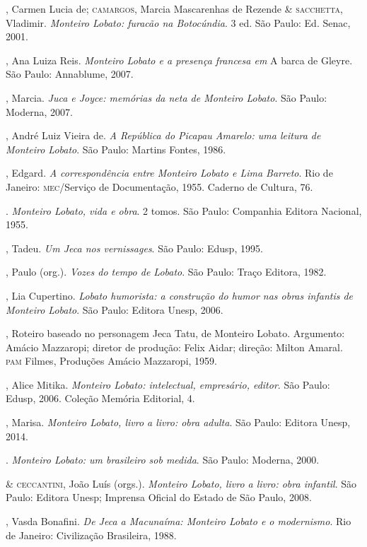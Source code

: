 \begin{bibliohedra}
, Carmen Lucia de; \textsc{camargos}, Marcia Mascarenhas de Rezende \&
\textsc{sacchetta}, Vladimir. \emph{Monteiro Lobato: furacão na Botocúndia}. 3
ed. São Paulo: Ed. Senac, 2001.

, Ana Luiza Reis. \emph{Monteiro Lobato e a presença francesa em} A
barca de Gleyre. São Paulo: Annablume, 2007.

, Marcia. \emph{Juca e Joyce: memórias da neta de Monteiro
Lobato}. São Paulo: Moderna, 2007.

, André Luiz Vieira de. \emph{A República do Picapau Amarelo: uma
leitura de Monteiro Lobato}. São Paulo: Martins Fontes, 1986.

, Edgard. \emph{A correspondência entre Monteiro Lobato e Lima
Barreto}. Rio de Janeiro: \textsc{mec}/Serviço de Documentação, 1955. Caderno de
Cultura, 76.

\titidem. \emph{Monteiro Lobato, vida e obra}. 2 tomos. São
Paulo: Companhia Editora Nacional, 1955.

, Tadeu. \emph{Um Jeca nos vernissages}. São Paulo: Edusp,
1995.

, Paulo (org.). \emph{Vozes do tempo de Lobato}. São Paulo: Traço
Editora, 1982.

, Lia Cupertino. \emph{Lobato humorista: a construção do humor nas
obras infantis de Monteiro Lobato}. São Paulo: Editora Unesp, 2006.

, Roteiro baseado no personagem Jeca Tatu, de Monteiro
Lobato. Argumento: Amácio Mazzaropi; diretor de produção: Felix Aidar;
direção: Milton Amaral. \textsc{pam} Filmes, Produções Amácio Mazzaropi, 1959.

, Alice Mitika. \emph{Monteiro Lobato: intelectual, empresário,
editor}. São Paulo: Edusp, 2006. Coleção Memória Editorial, 4.

, Marisa. \emph{Monteiro Lobato, livro a livro: obra adulta}. São
Paulo: Editora Unesp, 2014.

\titidem. \emph{Monteiro Lobato: um brasileiro sob medida}. São
Paulo: Moderna, 2000.

\titidem \& \textsc{ceccantini}, João Luís (orgs.). \emph{Monteiro Lobato,
livro a livro: obra infantil}. São Paulo: Editora Unesp; Imprensa
Oficial do Estado de São Paulo, 2008.

, Vasda Bonafini. \emph{De Jeca a Macunaíma: Monteiro Lobato e o
modernismo}. Rio de Janeiro: Civilização Brasileira, 1988.


\end{bibliohedra}
